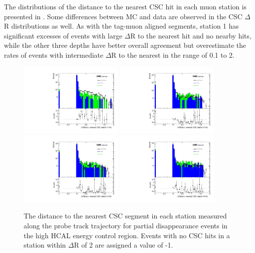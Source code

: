 The distributions of the distance to the nearest CSC hit in each muon station is presented in . 
Some differences between MC and data are observed in the CSC $\Delta$R distributions as well. 
As with the tag-muon aligned segments, station 1 has significant excesses of events with large $\Delta$R to the nearest hit and no nearby hits, while the other three depths have better overall agreement but overestimate the rates of events with intermediate $\Delta$R to the nearest in the range of 0.1 to 2.

\begin{figure}[htbp]
	\label{fig:BDTcscvalid}
	\centering
	\includegraphics[width=0.45\textwidth]{figures/highHcal_cscDr_station0.pdf}
	\hspace{0.01\textwidth}
	\includegraphics[width=0.45\textwidth]{figures/highHcal_cscDr_station1.pdf}
	\vspace{0.01\textwidth}
	\includegraphics[width=0.45\textwidth]{figures/highHcal_cscDr_station2.pdf}
	\hspace{0.01\textwidth}
	\includegraphics[width=0.45\textwidth]{figures/highHcal_cscDr_station3.pdf} 
        \caption[CSC Segment Validation]{The distance to the nearest CSC segment in each station measured along the probe track trajectory for partial disappearance events in the high HCAL energy control region. Events with no CSC hits in a station within $\Delta$R of 2 are assigned a value of -1.}
\end{figure}


